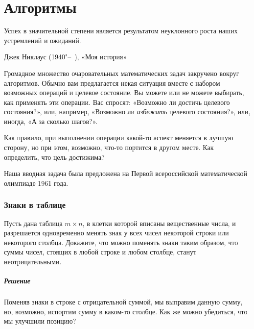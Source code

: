 \documentclass[twoside]{book}
\makeatletter
\newcommand{\rindex}[2][\imki@jobname]{%
  \index[#1]{\detokenize{#2}}%
}
\makeatother
\begin{document}

\chapter{Алгоритмы}


\setlength{\epigraphwidth}{.65\textwidth}
\epigraph{Успех в значительной степени является результатом неуклонного роста наших устремлений и ожиданий.\vspace{1ex}}{Джек Никлаус (1940"--~), «Моя история»}



Громадное множество очаровательных математических задач закручено вокруг алгоритмов.
Обычно вам  предлагается некая ситуация вместе с набором возможных операций и целевое состояние.
Вы можете или не можете выбирать, как применять эти операции.
Вас спросят: «Возможно ли достичь целевого состояния?», или, например, «Возможно ли \emph{избежать} целевого состояния?», или, иногда, «А за сколько шагов?».

Как правило, при выполнении операции какой-то аспект меняется в лучшую сторону, но при этом, возможно, что-то портится в другом месте.
Как определить, что цель достижима?

Наша вводная задача была предложена на Первой всероссийской математической олимпиаде 1961 года.

\subsection*{Знаки в таблице}%
\rindex{Знаки в таблице}

Пусть дана таблица $m\times n$, в клетки которой вписаны вещественные числа, и разрешается одновременно менять знак у всех чисел некоторой строки или некоторого столбца.
Докажите, что можно поменять знаки таким образом, что суммы чисел, стоящих в любой строке и любом столбце, станут неотрицательными.

\paragraph{Решение}
Поменяв знаки в строке с отрицательной суммой, мы выправим данную сумму, но, возможно, испортим сумму в каком-то столбце.
Как же можно убедиться, что мы улучшили позицию?
\end{document}
